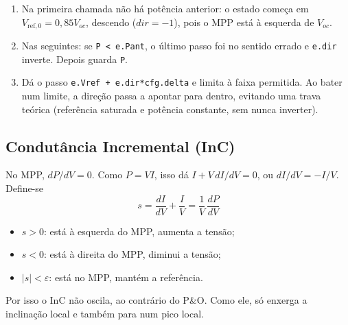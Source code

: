 
\begin{logica}
\begin{enumerate}
\item Na primeira chamada n\~ao h\'a pot\^encia anterior: o estado come\c{c}a em $V_{\mathrm{ref},0}=0{,}85V_{oc}$, descendo ($dir=-1$), pois o MPP est\'a \`a esquerda de $V_{oc}$.
\item Nas seguintes: se \texttt{P < e.Pant}, o \'ultimo passo foi no sentido errado e \texttt{e.dir} inverte. Depois guarda \texttt{P}.
\item D\'a o passo \texttt{e.Vref + e.dir*cfg.delta} e limita \`a faixa permitida. Ao bater num limite, a dire\c{c}\~ao passa a apontar para dentro, evitando uma trava
 te\'orica (refer\^encia saturada e pot\^encia constante, sem nunca inverter).
\end{enumerate}
\end{logica}

\subsection{Condut\^ancia Incremental (InC)}

No MPP, $dP/dV=0$. Como $P=VI$, isso d\'a $I+V\,dI/dV=0$, ou $dI/dV=-I/V$. Define-se
\begin{equation}
s=\frac{dI}{dV}+\frac{I}{V}=\frac{1}{V}\,\frac{dP}{dV}
\end{equation}
\begin{itemize}
\item $s>0$: est\'a \`a esquerda do MPP, aumenta a tens\~ao;
\item $s<0$: est\'a \`a direita do MPP, diminui a tens\~ao;
\item $|s|<\varepsilon$: est\'a no MPP, mant\'em a refer\^encia.
\end{itemize}
Por isso o InC n\~ao oscila, ao contr\'ario do P\&O. Como ele, s\'o enxerga a inclina\c{c}\~ao local e tamb\'em para num pico local.

